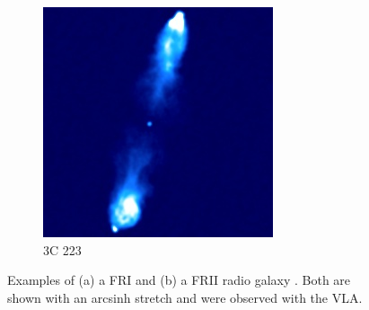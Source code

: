 \documentclass[11pt, a4paper]{book}
\begin{document}
\begin{figure}
\begin{subfigure}{0.45\textwidth}
                \includegraphics[width=\textwidth]{images/3C_223.jpg}
                \caption{3C 223}
                \label{fig:3C223}
            \end{subfigure}
            \caption[Examples of a FRI and a FRII radio galaxy.]{\label{fig:fri-frii} Examples of (a) a FRI \citep{laing_rotation_1987} and (b) a FRII radio galaxy \citep{leahy_vla_1991}. Both are shown with an arcsinh stretch and were observed with the VLA.}
        \end{figure}
\end{document}
